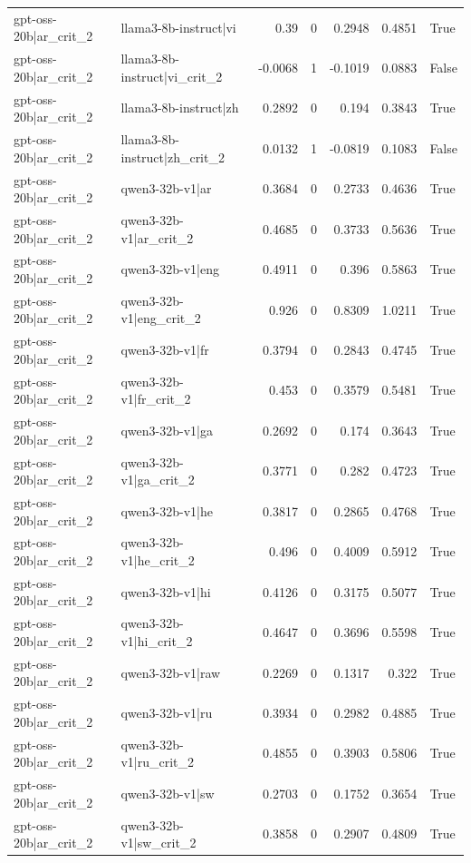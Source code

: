 \begin{table}
\begin{tabular}{l l r r r r l}
gpt-oss-20b|ar_crit_2 & llama3-8b-instruct|vi & 0.39 & 0 & 0.2948 & 0.4851 & True \\
gpt-oss-20b|ar_crit_2 & llama3-8b-instruct|vi_crit_2 & -0.0068 & 1 & -0.1019 & 0.0883 & False \\
gpt-oss-20b|ar_crit_2 & llama3-8b-instruct|zh & 0.2892 & 0 & 0.194 & 0.3843 & True \\
gpt-oss-20b|ar_crit_2 & llama3-8b-instruct|zh_crit_2 & 0.0132 & 1 & -0.0819 & 0.1083 & False \\
gpt-oss-20b|ar_crit_2 & qwen3-32b-v1|ar & 0.3684 & 0 & 0.2733 & 0.4636 & True \\
gpt-oss-20b|ar_crit_2 & qwen3-32b-v1|ar_crit_2 & 0.4685 & 0 & 0.3733 & 0.5636 & True \\
gpt-oss-20b|ar_crit_2 & qwen3-32b-v1|eng & 0.4911 & 0 & 0.396 & 0.5863 & True \\
gpt-oss-20b|ar_crit_2 & qwen3-32b-v1|eng_crit_2 & 0.926 & 0 & 0.8309 & 1.0211 & True \\
gpt-oss-20b|ar_crit_2 & qwen3-32b-v1|fr & 0.3794 & 0 & 0.2843 & 0.4745 & True \\
gpt-oss-20b|ar_crit_2 & qwen3-32b-v1|fr_crit_2 & 0.453 & 0 & 0.3579 & 0.5481 & True \\
gpt-oss-20b|ar_crit_2 & qwen3-32b-v1|ga & 0.2692 & 0 & 0.174 & 0.3643 & True \\
gpt-oss-20b|ar_crit_2 & qwen3-32b-v1|ga_crit_2 & 0.3771 & 0 & 0.282 & 0.4723 & True \\
gpt-oss-20b|ar_crit_2 & qwen3-32b-v1|he & 0.3817 & 0 & 0.2865 & 0.4768 & True \\
gpt-oss-20b|ar_crit_2 & qwen3-32b-v1|he_crit_2 & 0.496 & 0 & 0.4009 & 0.5912 & True \\
gpt-oss-20b|ar_crit_2 & qwen3-32b-v1|hi & 0.4126 & 0 & 0.3175 & 0.5077 & True \\
gpt-oss-20b|ar_crit_2 & qwen3-32b-v1|hi_crit_2 & 0.4647 & 0 & 0.3696 & 0.5598 & True \\
gpt-oss-20b|ar_crit_2 & qwen3-32b-v1|raw & 0.2269 & 0 & 0.1317 & 0.322 & True \\
gpt-oss-20b|ar_crit_2 & qwen3-32b-v1|ru & 0.3934 & 0 & 0.2982 & 0.4885 & True \\
gpt-oss-20b|ar_crit_2 & qwen3-32b-v1|ru_crit_2 & 0.4855 & 0 & 0.3903 & 0.5806 & True \\
gpt-oss-20b|ar_crit_2 & qwen3-32b-v1|sw & 0.2703 & 0 & 0.1752 & 0.3654 & True \\
gpt-oss-20b|ar_crit_2 & qwen3-32b-v1|sw_crit_2 & 0.3858 & 0 & 0.2907 & 0.4809 & True \\

\end{tabular}
\end{table}
